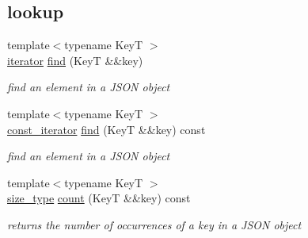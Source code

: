\subsection*{lookup}
\begin{DoxyCompactItemize}
\item 
{\footnotesize template$<$typename KeyT $>$ }\\\hyperlink{classnlohmann_1_1basic__json_a099316232c76c034030a38faa6e34dca}{iterator} \hyperlink{classnlohmann_1_1basic__json_a89eb3928f57903677051c80534be9cb1}{find} (KeyT \&\&key)
\begin{DoxyCompactList}\small\item\em find an element in a J\+S\+ON object \end{DoxyCompactList}\item 
{\footnotesize template$<$typename KeyT $>$ }\\\hyperlink{classnlohmann_1_1basic__json_a41a70cf9993951836d129bb1c2b3126a}{const\+\_\+iterator} \hyperlink{classnlohmann_1_1basic__json_ae625a0647486edf2bb38c849ca67f934}{find} (KeyT \&\&key) const
\begin{DoxyCompactList}\small\item\em find an element in a J\+S\+ON object \end{DoxyCompactList}\item 
{\footnotesize template$<$typename KeyT $>$ }\\\hyperlink{classnlohmann_1_1basic__json_a39f2cd0b58106097e0e67bf185cc519b}{size\+\_\+type} \hyperlink{classnlohmann_1_1basic__json_a0d74bfcf65662f1d66d14c34b0027098}{count} (KeyT \&\&key) const
\begin{DoxyCompactList}\small\item\em returns the number of occurrences of a key in a J\+S\+ON object \end{DoxyCompactList}\end{DoxyCompactItemize}
